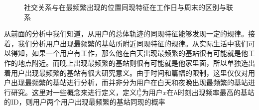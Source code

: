 \begin{figure}[!ht]
    \centering
    \hspace{7em} %
    \caption{社交关系与在最频繁出现的位置同现特征在工作日与周末的区别与联系}
    \label{fig-spatialhomoMost}
\end{figure}


从前面的分析中我们知道，从用户的总体轨迹的同现特征能够发现一定的规律。接着，我们分析用户出现最频繁的基站所附近同现特征的规律。从实际生活中我们可以得知，如果一个用户有工作，那么他在白天出现最频繁的基站很有可能就是他工作的地点附近。而晚上出现最频繁的基站则很有可能就是他家里面，所以单独选出着用户出现最频繁的基站有很大研究意义。由于时间和篇幅的限制，这里仅仅对用户出现最频繁的基站进行分析，而并非分为用户在白天和夜晚出现最频繁的基站进行研究。这里对一些概念来进行定义，定义$l_x^h$为用户$x$在$h$时刻出现频率最高的基站的ID，则用户两个用户出现最频繁的基站同现的概率

